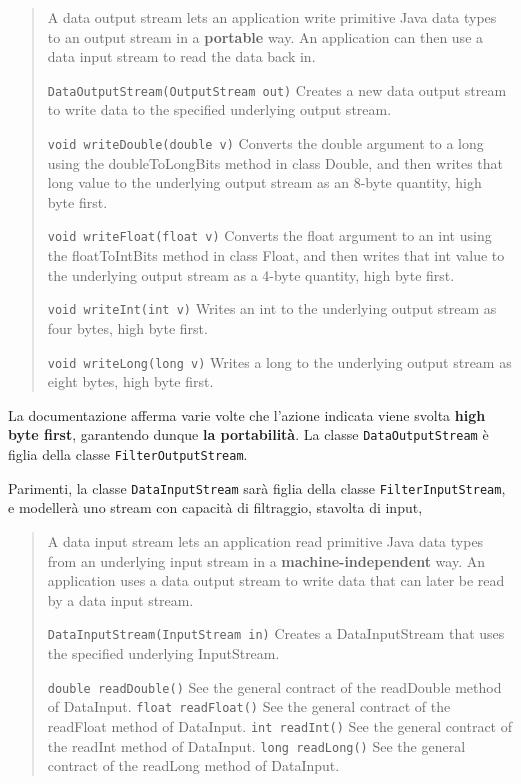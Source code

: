 \documentclass[\fontsizeclass,twocolumn]{\classname}
\theoremstyle{definition}
\theoremstyle{definition}
\begin{document}
\begin{quote}
    \footnotesize{A data output stream lets an application write primitive Java data types to an output stream in a \textbf{portable} way. An application can then use a data input stream to read the data back in.

        \texttt{DataOutputStream(OutputStream out)} 	Creates a new data
        output stream to write data to the specified underlying output stream.

        \texttt{void 	writeDouble(double v)} 	Converts the double argument to a long using the doubleToLongBits method in class Double, and then writes that long value to the underlying output stream as an 8-byte quantity, high byte first.

        \texttt{void 	writeFloat(float v)} 	Converts the float argument to an int using the floatToIntBits method in class Float, and then writes that int value to the underlying output stream as a 4-byte quantity, high byte first.

        \texttt{void 	writeInt(int v)} 	Writes an int to the underlying output stream as four bytes, high byte first.

        \texttt{void 	writeLong(long v)} 	Writes a long to the underlying output stream as eight bytes, high byte first.
    }
\end{quote}

La documentazione afferma varie volte che l'azione indicata viene svolta
\textbf{high byte first}, garantendo dunque \textbf{la portabilità}. La classe
\texttt{DataOutputStream} è figlia della classe \texttt{FilterOutputStream}.

Parimenti, la classe \texttt{DataInputStream} sarà figlia della classe
\texttt{FilterInputStream}, e modellerà uno stream con capacità di filtraggio,
stavolta di input,

\begin{quote}
    \footnotesize{A data input stream lets an application read primitive Java data types from an underlying input stream in a \textbf{machine-independent} way. An application uses a data output stream to write data that can later be read by a data input stream.

    \texttt{DataInputStream(InputStream in)} 	Creates a DataInputStream that uses the specified underlying InputStream.

    \texttt{double 	readDouble()} 	See the general contract of the readDouble method of DataInput.
    \texttt{float 	readFloat()} 	See the general contract of the readFloat method of DataInput.
    \texttt{int 	readInt()} 	See the general contract of the readInt method of DataInput.
    \texttt{long 	readLong()} 	See the general contract of the readLong method of DataInput.
    }
\end{quote}
\end{document}
